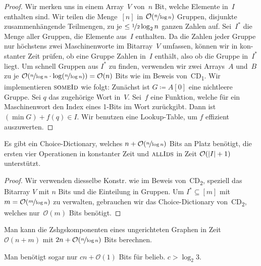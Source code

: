 \documentclass{cheat-sheet}
\renewcommand{\O}{\mathcal{O}} %
\begin{document}
\begin{proof}
  Wir merken uns in einem Array~$V$ von~$n$ Bit, welche Elemente in~$I$ enthalten sind.
  Wir teilen die Menge~$[n]$ in $\O(\nicefrac{n}{\log n})$ Gruppen, \dh{} disjunkte zusammenhängende Teilmengen, zu je $\leq \nicefrac{1}{2} \log_2 n$ ganzen Zahlen auf.
  Sei~$I^{*}$ die Menge aller Gruppen, die Elemente aus~$I$ enthalten.
  Da die Zahlen jeder Gruppe nur höchstens zwei Maschinenworte im Bitarray~$V$ umfassen, können wir in kon- stanter Zeit prüfen, ob eine Gruppe Zahlen in~$I$ enthält, also ob die Gruppe in~$I^{*}$ liegt.
  Um schnell Gruppen aus $I^{*}$ zu finden, verwenden wir zwei Arrays~$A$ und~$B$ zu je $\O(\nicefrac{n}{\log n} \cdot \log(\nicefrac{n}{\log n})) = \O(n)$ Bits wie im Beweis von~CD\textsubscript{1}.
  Wir implementieren $\Call{someId}{}$ wie folgt: Zunächst ist $G \coloneqq A[0]$ eine nichtleere Gruppe. Sei $q$ das zugehörige Wort in~$V$. Sei~$f$ eine Funktion, welche für ein Maschinenwort den Index eines 1-Bits im Wort zurückgibt. Dann ist $(\min G) + f(q) \in I$.
  Wir benutzen eine Lookup-Table, um $f$ effizient auszuwerten.
\end{proof}

\begin{thm}[CD\textsubscript{3}]
  Es gibt ein Choice-Dictionary, welches $n + \O(\nicefrac{n}{\log n})$ Bits an Platz benötigt, die ersten vier Operationen in konstanter Zeit und $\Call{allIds}{}$ in Zeit $\O(\abs{I} + 1)$ unterstützt.
\end{thm}

\begin{proof}
  Wir verwenden diesselbe Konstr. wie im Beweis von~CD\textsubscript{2}, speziell das Bitarray $V$ mit $n$ Bits und die Einteilung in Gruppen.
  Um $I^{*} \subseteq [m]$ mit $m = \O(\nicefrac{m}{\log n})$ zu verwalten, gebrauchen wir das Choice-Dictionary von~CD\textsubscript{2}, welches nur~$\O(m)$ Bits benötigt.
\end{proof}

\begin{kor}
  Man kann die Zshgskomponenten eines ungerichteten Graphen in Zeit $\O(n + m)$ mit $2 n + \O(\nicefrac{n}{\log n})$ Bits berechnen.
\end{kor}

\begin{bem}
  Man benötigt sogar nur $c n + \O(1)$ Bits für belieb. $c > \log_2 3$.
\end{bem}

\end{document}
